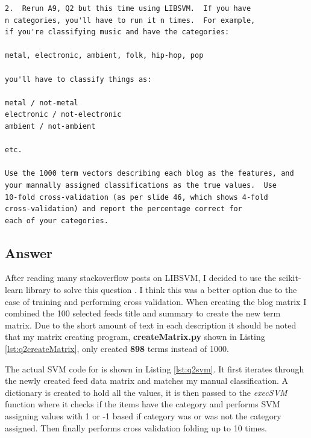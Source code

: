 \documentclass[letterpaper,11pt]{article}
\begin{document}
\begin{verbatim}
2.  Rerun A9, Q2 but this time using LIBSVM.  If you have 
n categories, you'll have to run it n times.  For example, 
if you're classifying music and have the categories:

metal, electronic, ambient, folk, hip-hop, pop

you'll have to classify things as:

metal / not-metal
electronic / not-electronic
ambient / not-ambient

etc.

Use the 1000 term vectors describing each blog as the features, and
your mannally assigned classifications as the true values.  Use
10-fold cross-validation (as per slide 46, which shows 4-fold
cross-validation) and report the percentage correct for 
each of your categories.
\end{verbatim}

\subsection*{Answer}

After reading many stackoverflow posts on LIBSVM, I decided to use the scikit-learn library to solve this question \cite{stack1}. I think this was a better option due to the ease of training and performing cross validation. When creating the blog matrix I combined the 100 selected feeds title and summary to create the new term matrix. Due to the short amount of text in each description it should be noted that my matrix creating program, \textbf{createMatrix.py} shown in Listing \ref{lst:q2createMatrix}, only created \textbf{898} terms instead of 1000. 

The actual SVM code for is shown in Listing \ref{lst:q2svm}. It first iterates through the newly created feed data matrix and matches my manual classification. A dictionary is created to hold all the values, it is then passed to the \textit{execSVM} function where it checks if the items have the category and performs SVM assigning values with 1 or -1 based if category was or was not the category assigned. Then finally performs cross validation folding up to 10 times.
\end{document}
